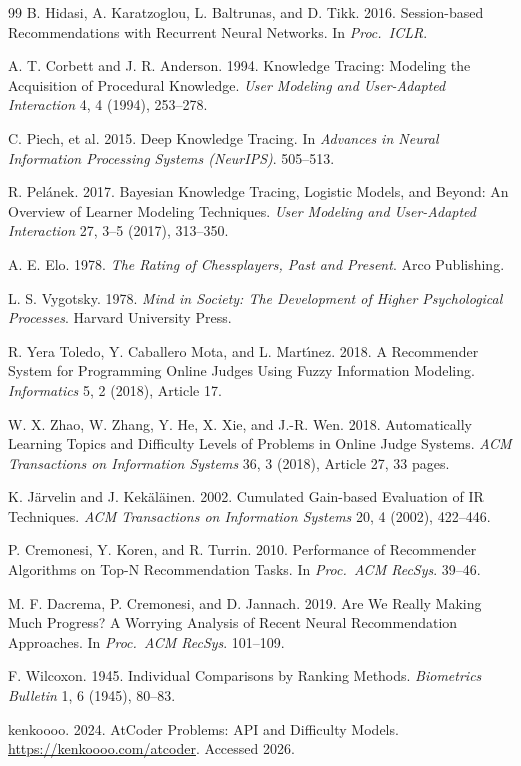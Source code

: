 \documentclass[12pt,a4paper]{article}
\begin{document}
\begin{thebibliography}{99}
 B. Hidasi, A. Karatzoglou, L. Baltrunas, and D. Tikk. 2016.
Session-based Recommendations with Recurrent Neural Networks. In \emph{Proc.\ ICLR}.

 A. T. Corbett and J. R. Anderson. 1994. Knowledge Tracing: Modeling
the Acquisition of Procedural Knowledge. \emph{User Modeling and User-Adapted Interaction}
4, 4 (1994), 253--278.

 C. Piech, et al. 2015. Deep Knowledge Tracing. In \emph{Advances in
Neural Information Processing Systems (NeurIPS)}. 505--513.

 R. Pel\'anek. 2017. Bayesian Knowledge Tracing, Logistic Models, and
Beyond: An Overview of Learner Modeling Techniques. \emph{User Modeling and User-Adapted
Interaction} 27, 3--5 (2017), 313--350.

 A. E. Elo. 1978. \emph{The Rating of Chessplayers, Past and Present}.
Arco Publishing.

 L. S. Vygotsky. 1978. \emph{Mind in Society: The Development of
Higher Psychological Processes}. Harvard University Press.

 R. Yera Toledo, Y. Caballero Mota, and L. Mart\'{\i}nez. 2018. A
Recommender System for Programming Online Judges Using Fuzzy Information Modeling.
\emph{Informatics} 5, 2 (2018), Article 17.

 W. X. Zhao, W. Zhang, Y. He, X. Xie, and J.-R. Wen. 2018.
Automatically Learning Topics and Difficulty Levels of Problems in Online Judge Systems.
\emph{ACM Transactions on Information Systems} 36, 3 (2018), Article 27, 33 pages.

 K. J\"arvelin and J. Kek\"al\"ainen. 2002. Cumulated Gain-based
Evaluation of IR Techniques. \emph{ACM Transactions on Information Systems} 20, 4 (2002),
422--446.

 P. Cremonesi, Y. Koren, and R. Turrin. 2010. Performance of
Recommender Algorithms on Top-N Recommendation Tasks. In \emph{Proc.\ ACM RecSys}. 39--46.

 M. F. Dacrema, P. Cremonesi, and D. Jannach. 2019. Are We Really
Making Much Progress? A Worrying Analysis of Recent Neural Recommendation Approaches. In
\emph{Proc.\ ACM RecSys}. 101--109.

 F. Wilcoxon. 1945. Individual Comparisons by Ranking Methods.
\emph{Biometrics Bulletin} 1, 6 (1945), 80--83.

 kenkoooo. 2024. AtCoder Problems: API and Difficulty Models.
\url{https://kenkoooo.com/atcoder}. Accessed 2026.

\end{thebibliography}
\end{document}
